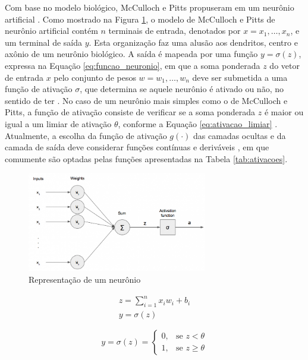 Com base no modelo biológico, McCulloch e Pitts propuseram em  um neurônio artificial \cite{mcculloch1943logical}. Como mostrado na Figura \ref{fig:neuronio}, o modelo de McCulloch e Pitts de neurônio artificial contém $n$ terminais de entrada, denotados por $x = x_1, \ldots, x_n$, e um terminal de saída $y$. Esta organização faz uma alusão aos dendritos, centro e axônio de um neurônio biológico. A saída é mapeada por uma função $y = \sigma(z)$, expressa na Equação \ref{eq:funcao_neuronio}, em que a soma ponderada $z$ do vetor de entrada $x$ pelo conjunto de pesos $w = w_1, \ldots, w_n$
deve ser submetida a uma função de ativação $\sigma$, que determina se aquele neurônio é ativado ou não, no sentido de ter . No caso de um neurônio mais simples como o de McCulloch e Pitts, a função de ativação consiste de verificar se a soma ponderada $z$ é maior ou igual a um limiar de ativação $\theta$, conforme a Equação \ref{eq:ativacao_limiar} \cite{mcculloch1943logical}. Atualmente, a escolha da função de ativação $g(\cdot)$ das camadas ocultas e da camada de saída deve considerar funções contínuas e deriváveis \cite{hornik1991approximation}, em que comumente são optadas pelas funções apresentadas na Tabela  \ref{tab:ativacoes}.

\begin{figure}[ht]
	\centering
	\includegraphics[width=0.7\textwidth]{img/perceptron.png}
	\caption{Representação de um neurônio}
	\label{fig:neuronio}
\end{figure}

\begin{gather}\label{eq:funcao_neuronio}
	z = \sum_{i=1}^n x_i w_i + b_i\\
	y = \sigma(z)
\end{gather}

\begin{equation}\label{eq:ativacao_limiar}
	y = \sigma(z) =
		\begin{cases}
			0, & \text{se } z < \theta\\
			1, & \text{se } z \geq \theta
		\end{cases}
\end{equation}


